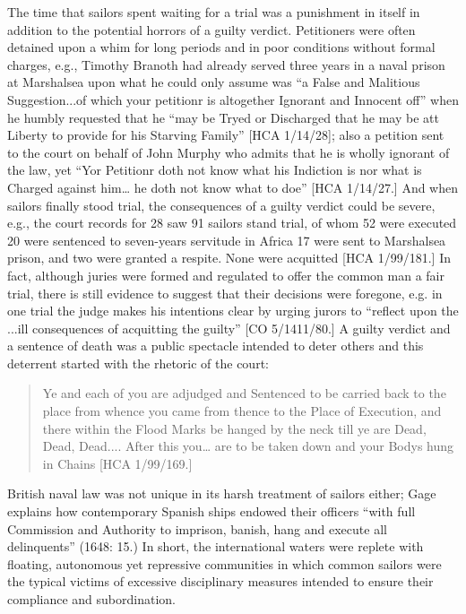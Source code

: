 The time that sailors spent waiting for a trial was a punishment in itself in addition to the potential horrors of a guilty verdict. Petitioners were often detained upon a whim for long periods and in poor conditions without formal charges, e.g., Timothy Branoth had already served three years in a naval prison at Marshalsea upon what he could only assume was “a False and Malitious Suggestion...of which your petitionr is altogether Ignorant and Innocent off” when he humbly requested that he “may be Tryed or Discharged that he may be att Liberty to provide for his Starving Family” [HCA 1/14/28]; also a petition sent to the court on behalf of John Murphy who admits that he is wholly ignorant of the law, yet “Yor Petitionr doth not know what his Indiction is nor what is Charged against him… he doth not know what to doe” [HCA 1/14/27.] And when sailors finally stood trial, the consequences of a guilty verdict could be severe, e.g., the court records for 28 \citealt{March1722} saw 91 sailors stand trial, of whom 52 were executed 20 were sentenced to seven-years servitude in Africa 17 were sent to Marshalsea prison, and two were granted a respite. None were acquitted [HCA 1/99/181.] In fact, although juries were formed and regulated to offer the common man a fair trial, there is still evidence to suggest that their decisions were foregone, e.g. in one trial the judge makes his intentions clear by urging jurors to “reflect upon the ...ill consequences of acquitting the guilty” [CO 5/1411/80.] A guilty verdict and a sentence of death was a public spectacle intended to deter others and this deterrent started with the rhetoric of the court: 

\begin{quotation}
Ye and each of you are adjudged and Sentenced to be carried back to the place from whence you came from thence to the Place of Execution, and there within the Flood Marks be hanged by the neck till ye are Dead, Dead, Dead.... After this you… are to be taken down and your Bodys hung in Chains [HCA 1/99/169.] \end{quotation}

British naval law was not unique in its harsh treatment of sailors either; Gage explains how contemporary Spanish ships endowed their officers “with full Commission and Authority to imprison, banish, hang and execute all delinquents” (1648: 15.) In short, the international waters were replete with floating, autonomous yet repressive communities in which common sailors were the typical victims of excessive disciplinary measures intended to ensure their compliance and subordination. 

